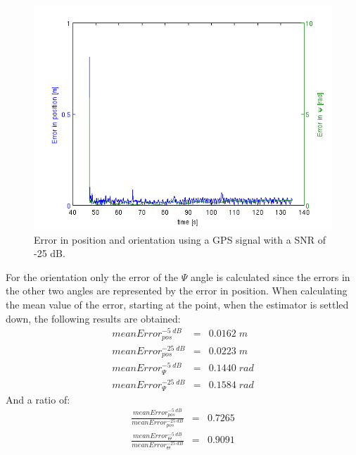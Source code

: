 \begin{figure}[hb]
\centering
\includegraphics[width=1\textwidth]{pictures/2_2_SNR25_errors_GPS.png}
\caption{Error in position and orientation 	using a GPS signal with a SNR of -25 dB.}
\label{error_25snr}
\end{figure}
For the orientation only the error of the $\Psi$ angle is calculated since the errors in the other two angles are represented by the error in position. When calculating the mean value of the error, starting at the point, when the estimator is settled down, the following results are obtained:
\begin{eqnarray}
meanError_{pos}^{-5\;dB}&=&0.0162\;m \\ meanError_{pos}^{-25\;dB}&=&0.0223\;m \\ meanError_{\Psi}^{-5\;dB}&=& 0.1440\;rad\\ meanError_{\Psi}^{-25\;dB}&=& 0.1584 \;rad
\end{eqnarray}
And a ratio of:
\begin{eqnarray}
\frac{meanError_{pos}^{-5\;dB}}{meanError_{pos}^{-25\;dB}}&=&0.7265 \\ \frac{meanError_{\Theta}^{-5\;dB}}{meanError_{\Theta}^{-25\;dB}}&=&0.9091
\end{eqnarray}



